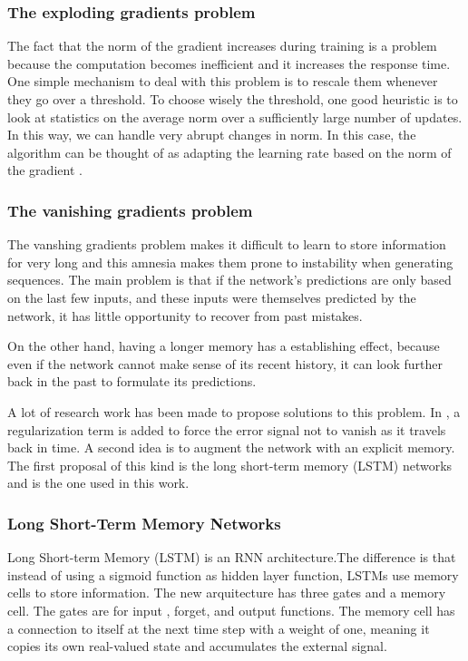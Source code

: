 \subsubsection*{The exploding gradients problem}
 The fact that the norm of the gradient increases during training is a problem because the computation becomes inefficient and it increases the response time. One simple mechanism to deal with this problem is to rescale them whenever they go over a threshold. To choose wisely the threshold, one good heuristic is to look at statistics on the average norm over a sufficiently large number of updates. In this way, we can handle very abrupt changes in norm. In this case, the algorithm can be thought of as adapting the learning rate based on the norm of the gradient  \cite{pascanu2013difficulty}.

\subsubsection*{The vanishing gradients problem}

The vanshing gradients problem makes it difficult to learn to store information for very long and this amnesia makes them prone to instability when generating sequences. The main problem is that if the network's predictions  are only based on the last few inputs, and these inputs were themselves predicted by the network, it has little opportunity to recover from past mistakes.

On the other hand, having a longer memory has a establishing effect, because even if the network cannot make sense of its recent history, it can look further back in the past to formulate its predictions. \cite{graves2013generating}

A lot of research work has been made to propose solutions to this problem. In \cite{pascanu2013difficulty}, a regularization term  is added to force the error signal not to vanish as it travels back in time. A second idea is to augment the network with an explicit memory. The first proposal of this kind is the long short-term memory (LSTM) networks and is the one used in this work.

\subsubsection{Long Short-Term Memory Networks}
Long Short-term Memory (LSTM) is an RNN architecture.The difference is that instead of using a sigmoid function as hidden layer function, LSTMs use memory cells to store information. The new arquitecture has three gates and a memory cell. The gates are for input , forget, and output functions. The memory cell has a connection to itself at the next time step with a weight of one, meaning it copies its own real-valued state and accumulates the external signal\cite{lecun2015deep}. 


